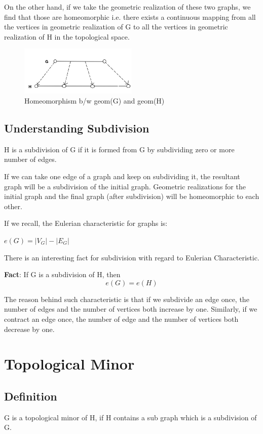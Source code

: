 \documentclass{article}
\begin{document}
On the other hand, if we take the geometric realization of these two graphs, we find that those are homeomorphic i.e. there exists a continuous mapping from all the vertices in geometric realization of G to all the vertices in geometric realization of H in the topological space.

\begin{figure}[h]
    \centering
    \includegraphics[width=0.5\textwidth]{images/fig3.png}
    \caption{Homeomorphism b/w geom(G) and geom(H)}
    \label{fig:}
\end{figure}

\subsection{Understanding Subdivision}

H is a subdivision of G if it is formed from G by subdividing zero or more number of edges.

If we can take one edge of a graph and keep on subdividing it, the resultant graph will be a subdivision of the initial graph. Geometric realizations for the initial graph and the final graph (after subdivision) will be homeomorphic to each other.

If we recall, the Eulerian characteristic for graphs is:

$e(G) = |V_G| - |E_G|$

There is an interesting fact for subdivision with regard to Eulerian Characteristic.

\textbf{Fact}: If G is a subdivision of H, then $$e(G) = e(H)$$

The reason behind such characteristic is that if we subdivide an edge once, the number of edges and the number of vertices both increase by one. Similarly, if we contract an edge once, the number of edge and the number of vertices both decrease by one.

\section{Topological Minor}
\subsection{\textbf{Definition}}
G is a topological minor of H, if H contains a sub graph which is a subdivision of G.
\end{document}
